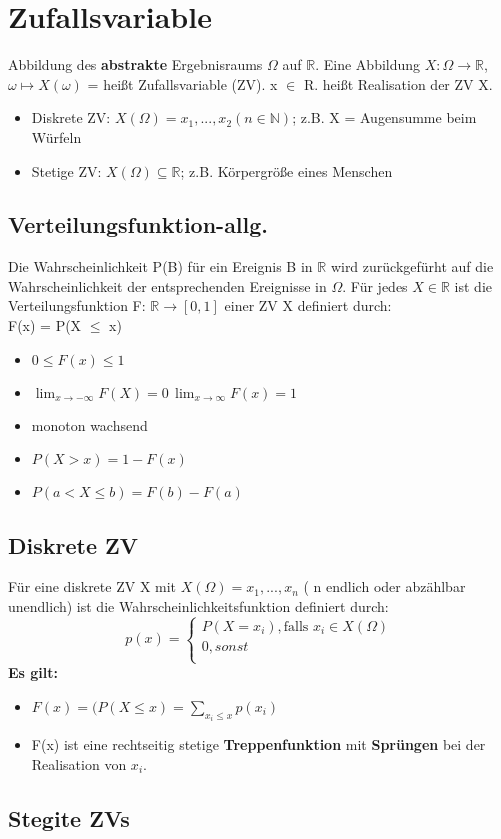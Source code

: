\section{Zufallsvariable}
Abbildung des \textbf{abstrakte} Ergebnisraums $\Omega$ auf $\mathbb{R}$.
Eine Abbildung $X: \Omega \rightarrow \mathbb{R}$, $\omega \mapsto X(\omega)$ = heißt Zufallsvariable (ZV). x $\in$ R. heißt Realisation der ZV X.
  \begin{itemize}
    \item Diskrete ZV: $X(\Omega) = {x_{1}, ..., x_{2}} (n \in \mathbb{N})$; z.B. X = \dq Augensumme beim Würfeln \dq
    \item Stetige ZV: $X(\Omega) \subseteq \mathbb{R}$; \dq z.B. Körpergröße eines Menschen\dq
  \end{itemize}
\subsection{Verteilungsfunktion-allg.}
Die Wahrscheinlichkeit P(B) für ein Ereignis B in $\mathbb{R}$ wird zurückgefürht auf die Wahrscheinlichkeit der entsprechenden Ereignisse in $\Omega$. Für jedes $X \in \mathbb{R}$  ist die Verteilungsfunktion F: $\mathbb{R} \rightarrow [0,1]$ einer ZV X definiert durch:\\
	F(x) = P(X $\leq$ x)
\begin{itemize}
	\item $0 \leq F(x) \leq 1$
	\item $\displaystyle\lim_{x\to-\infty} F(X)= 0 \, \lim_{x\to\infty} F(x) = 1$
	\item monoton wachsend
	\item $P(X > x) = 1 - F(x)$
	\item $P(a < X \leq b) = F(b) - F(a)$
\end{itemize}
\subsection{Diskrete ZV}
Für eine diskrete ZV X mit $X(\Omega) = {x_{1}, ..., x_{n}}$ ( n endlich oder abzählbar unendlich) ist die Wahrscheinlichkeitsfunktion definiert durch:\\
\begin{equation}
p(x) =
\begin{cases}
	P(X = x_{i}), \text{falls } x_{i} \in X(\Omega )\\
	0, sonst\\
\end{cases}
\end{equation}
\textbf{Es gilt:}
\begin{itemize}
	\item $F(x) = (P(X \leq x) = \sum_{x_{i}\leq x} p(x_{i})$
	\item F(x) ist eine rechtseitig stetige \textbf{Treppenfunktion} mit \textbf{Sprüngen} bei der Realisation von $x_{i}$.
\end{itemize}
\subsection{Stegite ZVs}
